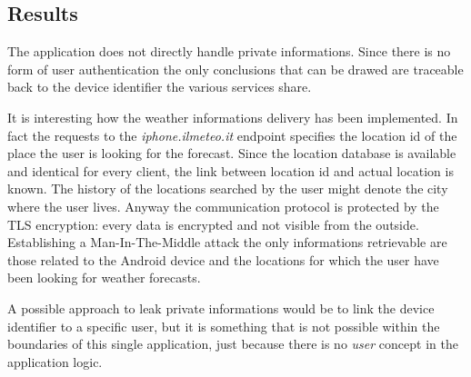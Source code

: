 		\subsection{Results}
			\par The application does not directly handle private informations. Since there is no form of user authentication the only conclusions that can be drawed are traceable back to the device identifier the various services share. \newline
			\par It is interesting how the weather informations delivery has been implemented. In fact the requests to the \textit{iphone.ilmeteo.it} endpoint specifies the location id of the place the user is looking for the forecast. Since the location database is available and identical for every client, the link between location id and actual location is known. The history of the locations searched by the user might denote the city where the user lives. Anyway the communication protocol is protected by the TLS encryption: every data is encrypted and not visible from the outside. Establishing a Man-In-The-Middle attack the only informations retrievable are those related to the Android device and the locations for which the user have been looking for weather forecasts. \newline
			\par A possible approach to leak private informations would be to link the device identifier to a specific user, but it is something that is not possible within the boundaries of this single application, just because there is no \textit{user} concept in the application logic.
			
			\newpage
			